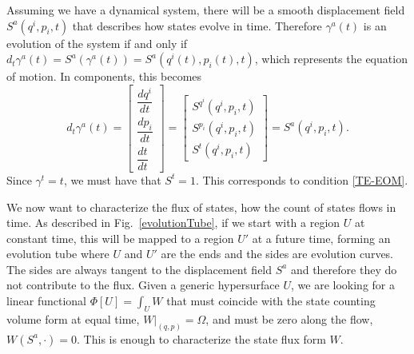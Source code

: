 \documentclass[nofootinbib,aps,pre]{revtex4-2}
\begin{document}
Assuming we have a dynamical system, there will be a smooth displacement field $S^a(q^i,p_i,t)$ that describes how states evolve in time. Therefore $\gamma^a(t)$ is an evolution of the system if and only if $d_t \gamma^a(t) = S^a(\gamma^a(t)) = S^a(q^i(t),p_i(t),t)$, which represents the equation of motion. In components, this becomes
\begin{equation}
    d_t \gamma^a(t) = \begin{bmatrix}
\dfrac{dq^i}{dt} \\[1em]
\dfrac{dp_i}{dt} \\[1em]
\dfrac{dt}{dt}
\end{bmatrix} = \begin{bmatrix}
S^{q^i}(q^i,p_i,t) \\[1em]
S^{p_i}(q^i,p_i,t) \\[1em]
S^{t}(q^i,p_i,t) 
\end{bmatrix}= S^a(q^i,p_i,t).
\end{equation}
Since $\gamma^t = t$, we must have that $S^t=1$. This corresponds to condition \ref{TE-EOM}.

We now want to characterize the flux of states, how the count of states flows in time. As described in Fig.~\ref{evolutionTube}, if we start with a region $U$ at constant time, this will be mapped to a region $U'$ at a future time, forming an evolution tube where $U$ and $U'$ are the ends and the sides are evolution curves. The sides are always tangent to the displacement field $S^a$ and therefore they do not contribute to the flux. Given a generic hypersurface $U$, we are looking for a linear functional $\Phi[U] = \int_U W$ that must coincide with the state counting volume form at equal time, $W|_{(q,p)} = \Omega$, and must be zero along the flow, $W(S^a, \cdot) = 0$. This is enough to characterize the state flux form $W$.
\end{document}
